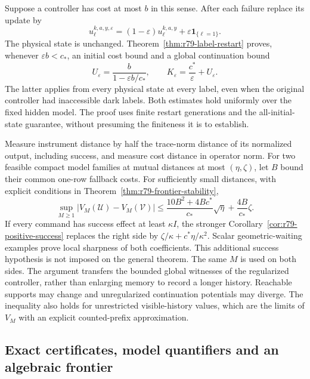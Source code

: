 Suppose a controller has cost at most $b$ in this sense.  After each
failure replace its update by
\[
 u^{k,a,y,\varepsilon}_\ell
 =(1-\varepsilon)u^{k,a,y}_\ell+
                   \varepsilon\mathbf1_{\{\ell=1\}}.
\]
The physical state is unchanged.  Theorem~\ref{thm:r79-label-restart}
proves, whenever $\varepsilon b<c_*$, an initial cost bound and a
global continuation bound
\[
 U_\varepsilon=\frac{b}{1-\varepsilon b/c_*},\qquad
 K_\varepsilon=\frac{c^*}{\varepsilon}+U_\varepsilon.
\]
The latter applies from every physical state at every label, even when
the original controller had inaccessible dark labels.  Both estimates
hold uniformly over the fixed hidden model.  The proof uses finite
restart generations and the all-initial-state guarantee, without
presuming the finiteness it is to establish.

Measure instrument distance by half the trace-norm distance of its
normalized output, including success, and measure cost distance in
operator norm.  For two feasible compact model families at mutual
distances at most $(\eta,\zeta)$, let $B$ bound their common one-row
fallback costs.  For sufficiently small distances, with explicit
conditions in Theorem~\ref{thm:r79-frontier-stability},
\begin{equation}\label{eq:r79-intro-stability}
 \sup_{M\ge1}|V_M(\mathcal U)-V_M(\mathcal V)|
 \le \frac{10B^2+4Bc^*}{c_*}\sqrt\eta
                   +\frac{4B}{c_*}\zeta.
\end{equation}
If every command has success effect at least $\kappa I$, the stronger
Corollary~\ref{cor:r79-positive-success} replaces the right side by
$\zeta/\kappa+c^*\eta/\kappa^2$.  Scalar geometric-waiting examples
prove local sharpness of both coefficients.  This additional success
hypothesis is not imposed on the general theorem.
The same $M$ is used on both sides.  The argument transfers the bounded
global witnesses of the regularized controller, rather than enlarging
memory to record a longer history.  Reachable supports may change and
unregularized continuation potentials may diverge.  The inequality
also holds for unrestricted visible-history values, which are the
limits of $V_M$ with an explicit counted-prefix approximation.

\subsection*{Exact certificates, model quantifiers and an algebraic frontier}

